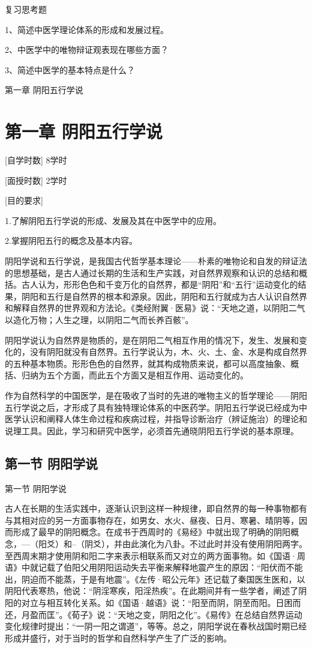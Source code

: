 \documentclass[a4paper,12pt,UTF8,twoside]{ctexbook}
\begin{document}
复习思考题

1、简述中医学理论体系的形成和发展过程。

2、中医学中的唯物辩证观表现在哪些方面？

3、简述中医学的基本特点是什么？

第一章 阴阳五行学说



\chapter{第一章 阴阳五行学说}

[自学时数] 8学时

[面授时数] 2学时

[目的要求]

1.了解阴阳五行学说的形成、发展及其在中医学中的应用。

2.掌握阴阳五行的概念及基本内容。

阴阳学说和五行学说，是我国古代哲学基本理论——朴素的唯物论和自发的辩证法的思想基础，是古人通过长期的生活和生产实践，对自然界观察和认识的总结和概括。古人认为，形形色色和千变万化的自然界，都是“阴阳”和“五行”运动变化的结果，阴阳和五行是自然界的根本和源泉。因此，阴阳和五行就成为古人认识自然界和解释自然界的世界观和方法论。《类经附翼·医易》说：“天地之道，以阴阳二气以造化万物；人生之理，以阴阳二气而长养百骸”。

阴阳学说认为自然界是物质的，是在阴阳二气相互作用的情况下，发生、发展和变化的，没有阴阳就没有自然界。五行学说认为，木、火、土、金、水是构成自然界的五种基本物质。形形色色的自然界，就其构成物质来说，都可以高度抽象、概括、归纳为五个方面，而此五个方面又是相互作用、运动变化的。

作为自然科学的中国医学，是在吸收了当时的先进的唯物主义的哲学理论——阴阳五行学说之后，才形成了具有独特理论体系的中医药学。阴阳五行学说已经成为中医学认识和阐释人体生命过程和疾病过程，并指导诊断治疗（辨证施治）的理论和说理工具。因此，学习和研究中医学，必须首先通晓阴阳五行学说的基本原理。

\section{第一节 阴阳学说}

第一节 阴阳学说

古人在长期的生活实践中，逐渐认识到这样一种规律，即自然界的每一种事物都有与其相对应的另一方面事物存在，如男女、水火、昼夜、日月、寒暑、晴阴等，因而形成了最早的阴阳概念。在成书于西周时的《易经》中就出现了明确的阴阳概念，—（阳爻）和--（阴爻），并由此演化为八卦。不过此时并没有使用阴阳两字。至西周末期才使用阴和阳二字来表示相联系而又对立的两方面事物。如《国语·周语》中就记载了伯阳父用阴阳运动失去平衡来解释地震产生的原因：“阳伏而不能出，阴迫而不能蒸，于是有地震”。《左传·昭公元年》还记载了秦国医生医和，以阴阳代表寒热，他说：“阴淫寒疾，阳淫热疾”。在此期间并有一些学者，阐述了阴阳的对立与相互转化关系。如《国语·越语》说：“阳至而阴，阴至而阳。日困而还，月盈而匡”。《荀子》说：“天地之变，阴阳之化”。《易传》在总结自然界运动变化规律时提出：“一阴一阳之谓道”，等等。总之，阴阳学说在春秋战国时期已经形成并盛行，对于当时的哲学和自然科学产生了广泛的影响。
\end{document}
